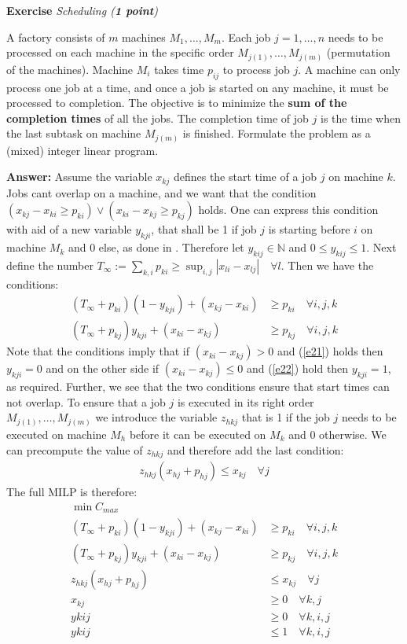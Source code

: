 \documentclass[a4paper,10pt]{article}
\newcounter{exc}
\newenvironment{exercise}[1]%
{\refstepcounter{exc}\textbf{Exercise \arabic{exc}} \emph{#1}\\}
{

\hrulefill\medskip}%
\begin{document}
\begin{exercise}{Scheduling (\textbf{1 point})}\label{ex:jss}

A factory consists of $m$ machines $M_1, \dots, M_m$.
Each job $j=1,\ldots,n$ needs to be processed on each machine in the specific order $M_{j(1)},\dots,M_{j(m)}$ (permutation of the machines). Machine $M_i$ takes time $p_{ij}$ to process job $j$. A machine can only process one job at a time, and once a job is started on any machine, it must be processed to completion. The objective is to minimize the \textbf{sum of the completion times} of all the jobs. The completion time of job $j$ is the time when the last subtask on machine $M_{j(m)}$ is finished. Formulate the problem as a (mixed) integer linear program.

  \textbf{Answer:}
Assume the variable $x_{kj}$ defines the start time of a job $j$ on machine $k$. Jobs cant overlap on a machine, and we want that the condition $(x_{kj} - x_{ki}\geq p_{ki}) \vee (x_{ki} - x_{kj}\geq p_{kj})$ holds. One can express this condition with aid of a new variable $y_{kji}$, that shall be 1 if job $j$ is starting before $i$ on machine $M_k$ and 0 else, as done in \cite{manne1960job}. Therefore let $y_{kij}\in \mathbb{N}$ and $0\leq y_{kij}\leq 1$. Next define the number $T_{\infty} := \sum_{k,i}p_{ki}\geq \sup_{i,j}|x_{li}-x_{lj}| \quad\forall l$.
Then we have the conditions:
\begin{align}
(T_\infty+p_{ki})(1-y_{kji}) + (x_{kj} - x_{ki}) & \geq p_{ki} \quad \forall i,j,k\label{e21}\\
(T_\infty+p_{kj})y_{kji} + (x_{ki} - x_{kj}) & \geq p_{kj} \quad \forall i,j,k\label{e22}
\end{align}
Note that the conditions imply that if $(x_{ki} - x_{kj})>0 $ and (\ref{e21}) holds then $y_{kji}=0$ and on the other side if $(x_{ki} - x_{kj})\leq 0$ and (\ref{e22}) hold then $y_{kji} =1 $, as required. Further, we see that the two conditions ensure that start times can not overlap.
To ensure that a job $j$ is executed in its right order $M_{j(1)},\dots,M_{j(m)}$ we introduce the variable $z_{hkj}$ that is 1 if the job $j$ needs to be executed on machine $M_h$ before it can be executed on $M_k$ and 0 otherwise. We can precompute the value of $z_{hkj}$ and therefore add the last condition:
\begin{align}
z_{hkj}(x_{hj} + p_{hj}) \leq x_{kj} \quad\forall j
\end{align}
The full MILP is therefore:
\begin{align}
\min C_{max} \\
(T_\infty+p_{ki})(1-y_{kji}) + (x_{kj} - x_{ki}) & \geq p_{ki} \quad \forall i,j,k \\
(T_\infty+p_{kj})y_{kji} + (x_{ki} - x_{kj}) & \geq p_{kj} \quad \forall i,j,k \\
z_{hkj}(x_{hj} + p_{hj}) & \leq x_{kj} \quad \forall j \\
x_{kj} & \geq 0 \quad\forall k,j \\
y{kij} & \geq 0 \quad\forall k,i,j \\
y{kij} & \leq 1 \quad\forall k,i,j \\
\end{align}


\end{exercise}
\end{document}
